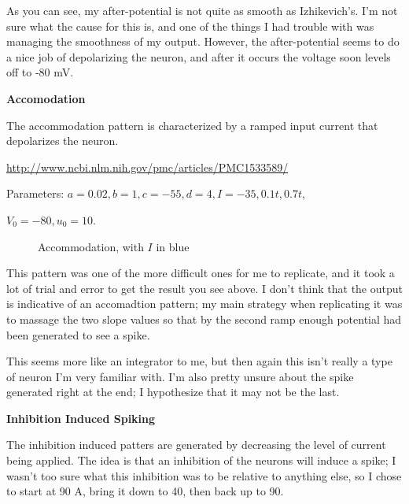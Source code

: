 \documentclass[a4paper,12pt]{article}
\begin{document}
As you can see, my after-potential is not quite as smooth as Izhikevich's. I'm not sure what the cause for this is, and one of the things I had trouble with was managing the smoothness of my output. However, the after-potential seems to do a nice job of depolarizing the neuron, and after it occurs the voltage soon levels off to -80 mV. 

\vfil\eject

{\bf Accomodation}
\bigskip

The accommodation pattern is characterized by a ramped input current that depolarizes the neuron. 

\url{http://www.ncbi.nlm.nih.gov/pmc/articles/PMC1533589/} 

\vspace{2mm} 

Parameters: $a=0.02, b=1, c=-55, d=4, I=-35, 0.1t, 0.7t, $

\vspace{1mm}

$V_{0}=-80, u_{0}=10$. 

\begin{figure}[h!]
\begin{center}
\end{center}
\caption{\label{pict18}Accommodation, with $I$ in blue}
\end{figure}

This pattern was one of the more difficult ones for me to replicate, and it took a lot of trial and error to get the result you see above. I don't think that the output is indicative of an accomadtion pattern; my main strategy when replicating it was to massage the two slope values so that by the second ramp enough potential had been generated to see a spike. 

\vspace{2mm}

This seems more like an integrator to me, but then again this isn't really a type of neuron I'm very familiar with. I'm also pretty unsure about the spike generated right at the end; I hypothesize that it may not be the last. 

\vfil\eject

{\bf Inhibition Induced Spiking}
\bigskip

The inhibition induced patters are generated by decreasing the level of current being applied. The idea is that an inhibition of the neurons will induce a spike; I wasn't too sure what this inhibition was to be relative to anything else, so I chose to start at 90 A, bring it down to 40, then back up to 90. 
\end{document}
